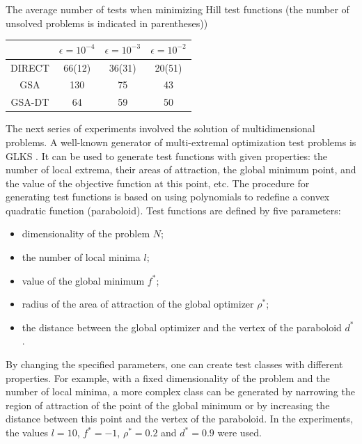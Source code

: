 \documentclass[entropy,article,submit,moreauthors,pdftex]{Definitions/mdpi}
\begin{document}
\begin{specialtable}[H] 
	\caption{The average number of tests when minimizing Hill test functions (the number of unsolved problems is indicated in parentheses))}\label{table:average_Hill}
	\center
\begin{tabular}{cccc}
\toprule
        & \textbf{$\epsilon = 10^{-4}$} & \textbf{$\epsilon = 10^{-3}$} & \textbf{$\epsilon = 10^{-2}$} \\
\midrule					  
DIRECT                & 66(12) & 36(31)  & 20(51)  \\
GSA                   & 130    & 75      & 43      \\
GSA-DT                & 64     & 59      & 50      \\
\bottomrule
\end{tabular}
\end{specialtable}

The next series of experiments involved the solution of multidimensional problems. 
A well-known generator of multi-extremal optimization test problems is GLKS  \cite{Gaviano2003}. It can be used to generate test functions with given properties: the number of local extrema, their areas of attraction, the global minimum point, and the value of the objective function at this point, etc. The procedure for generating test functions is based on using polynomials to redefine a convex quadratic function (paraboloid). Test functions are defined by five parameters:
\begin{itemize}
	\item dimensionality of the problem  $N$;
	\item the number of local minima $l$;
	\item value of the global minimum $f^*$;
	\item radius of the area of attraction of the global optimizer $\rho^*$;
	\item the distance between the global optimizer and the vertex of the paraboloid $d^*$.
\end{itemize}
By changing the specified parameters, one can create test classes with different properties. For example, with a fixed dimensionality of the problem and the number of local minima, a more complex class can be generated by narrowing the region of attraction of the point of the global minimum or by increasing the distance between this point and the vertex of the paraboloid. 
In the experiments, the values $l=10$, $f^*=-1$, $\rho^*=0.2$ and $d^*=0.9$ were used.
\end{document}

